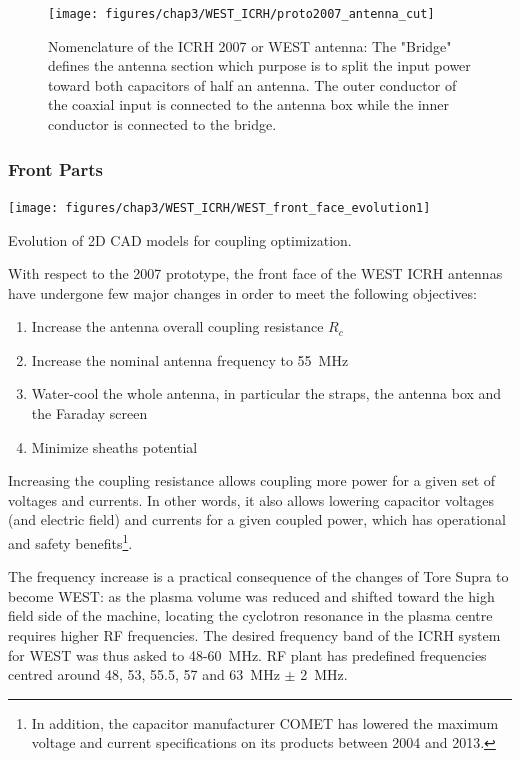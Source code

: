 \begin{figure}
	\centering
	\texttt{[image: figures/chap3/WEST\_ICRH/proto2007\_antenna\_cut]}
	\caption{Nomenclature of the ICRH 2007 or WEST antenna: The "Bridge" defines the antenna section which purpose is to split the input power toward both capacitors of half an antenna. The outer conductor of the coaxial input is connected to the antenna box while the inner conductor is connected to the bridge.}
	\label{fig:proto2007antennacut}
\end{figure}


\subsubsection{Front Parts}
\begin{marginfigure}[-1cm]
	\centering
	\texttt{[image: figures/chap3/WEST\_ICRH/WEST\_front\_face\_evolution1]}
	\caption{Evolution of 2D CAD models for coupling optimization.}
	\label{fig:westfrontfaceevolution1}
\end{marginfigure}

With respect to the 2007 prototype, the front face of the WEST ICRH antennas have undergone few major changes in order to meet the following objectives:
\begin{enumerate}
	\item Increase the antenna overall coupling resistance $R_c$
	\item Increase the nominal antenna frequency to 55~MHz
	\item Water-cool the whole antenna, in particular the straps, the antenna box and the Faraday screen
	\item Minimize sheaths potential
\end{enumerate}

Increasing the coupling resistance allows coupling more power for a given set of voltages and currents. In other words, it also allows lowering capacitor voltages (and electric field) and currents for a given coupled power, which has operational and safety benefits\footnote{In addition, the capacitor manufacturer COMET has lowered the maximum voltage and current specifications on its products between 2004 and 2013.}. 

The frequency increase is a practical consequence of the changes of Tore Supra to become WEST: as the plasma volume was reduced and  shifted toward the high field side of the machine, locating the cyclotron resonance in the plasma centre requires higher RF frequencies. The desired frequency band of the ICRH system for WEST was thus asked to 48-60~MHz. RF plant has predefined frequencies centred around 48, 53, 55.5, 57 and 63~MHz $\pm$ 2~MHz.
 
